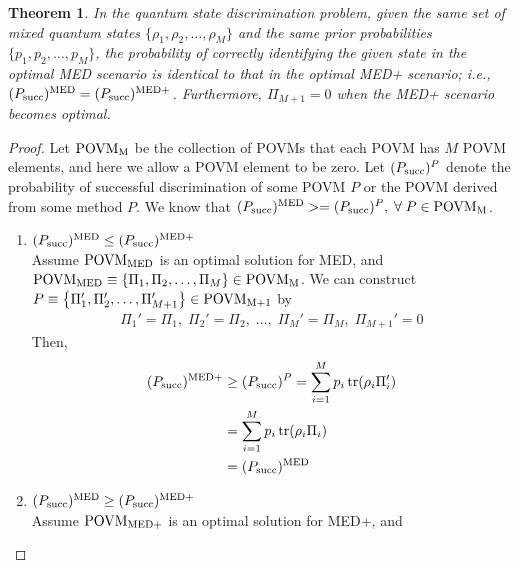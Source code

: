 \documentclass[11pt]{article}
\newtheorem{theorem}{Theorem}
\newcommand{\psucc}{P_{\textnormal{succ}}}
\newcommand{\povm}[1]{\textnormal{POVM}_{\textnormal{#1}}}
\newcommand{\PiSet}[1]{\left\{ \Pi_1, \Pi_2, \dots, \Pi_{#1} \right\}}
\newcommand{\PiSetPrime}[1]{\left\{ \Pi_1', \Pi_2', \dots, \Pi_{#1}' \right\}}
\newcommand{\supmed}{^{\textnormal{MED}}}
\newcommand{\supmedplus}{^{\textnormal{MED+}}}
\begin{document}
\begin{theorem} \label{thm:med_medplus}
    In the quantum state discrimination problem, given the same set of
    mixed quantum states $\{ \rho_{1}, \rho_{2}, \dots, \rho_{M} \}$
    and the same prior probabilities $\{p_{1}, p_{2}, \dots, p_{M}\}$, the probability of correctly identifying the given state in the optimal MED scenario is identical to that in the optimal MED+ scenario; i.e.,
    $(\psucc)\supmed = (\psucc)\supmedplus$.
    Furthermore, $\Pi_{M+1} = 0$ when the MED+ scenario becomes optimal.
\end{theorem}

\begin{proof}
    \noindent

    Let $\povm{M}$ be the collection of POVMs that each POVM has $M$ POVM
    elements, and here we allow a POVM element to be zero.
    Let $(\psucc)^{P}$ denote the probability of successful discrimination of
    some POVM $P$ or the POVM derived from some method $P$.
    We know that $(\psucc)\supmed >= (\psucc)^{P}, \; \forall \; P \in \povm{M}$.
    \begin{enumerate}
        \item $(\psucc)\supmed \leq (\psucc)\supmedplus$\\
              Assume $\povm{MED}$ is an optimal solution for MED, and\\
              $\povm{MED} \equiv \PiSet{M} \in \povm{M}$.
              We can construct $P \equiv \PiSetPrime{M+1} \in \povm{M+1}$
              by
              \begin{align*}
                  \Pi_{1}' = \Pi_{1}, \; \Pi_{2}' = \Pi_{2}, \; \dots,
                  \; \Pi_{M}' = \Pi_{M}, \; \Pi_{M+1}' = 0
              \end{align*}
              Then,
              \begin{align}
                  (\psucc)\supmedplus & \geq (\psucc)^{P}
                  = \sum_{i=1}^{M} p_{i} \operatorname{tr}(\rho_{i} \Pi_{i}')                      \\
                                      & = \sum_{i=1}^{M} p_{i} \operatorname{tr}(\rho_{i} \Pi_{i}) \\
                                      & = (\psucc)\supmed
              \end{align}
        \item $(\psucc)\supmed \geq (\psucc)\supmedplus$\\
              Assume $\povm{MED+}$ is an optimal solution for MED+, and\\

\end{enumerate}
\end{proof}
\end{document}
